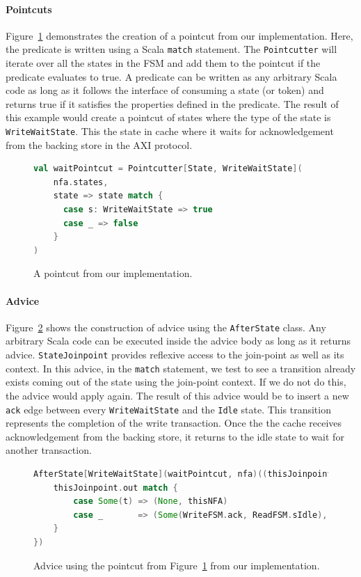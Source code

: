 \documentclass[conference]{IEEEtran}
\begin{document}
\paragraph{Pointcuts}
Figure~\ref{fig:pointcut} demonstrates the creation of a pointcut from our implementation. Here, the predicate is written using a Scala \texttt{match} statement. The \texttt{Pointcutter} will iterate over all the states in the FSM and add them to the pointcut if the predicate evaluates to true. A predicate can be written as any arbitrary Scala code as long as it follows the interface of consuming a state (or token) and returns true if it satisfies the properties defined in the predicate. The result of this example would create a pointcut of states where the type of the state is \texttt{WriteWaitState}. This the state in cache where it waits for acknowledgement from the backing store in the AXI protocol.

\begin{figure}[ht]
    \centering
    \begin{lstlisting}[language = Scala]
val waitPointcut = Pointcutter[State, WriteWaitState](
    nfa.states,
    state => state match {
      case s: WriteWaitState => true
      case _ => false
    }
)
    \end{lstlisting}
    \caption{A pointcut from our implementation.}
    \label{fig:pointcut}
\end{figure}

\paragraph{Advice}
Figure~\ref{fig:advice} shows the construction of advice using the \texttt{AfterState} class. Any arbitrary Scala code can be executed inside the advice body as long as it returns advice. \texttt{StateJoinpoint} provides reflexive access to the join-point as well as its context. In this advice, in the \texttt{match} statement, we test to see a transition already exists coming out of the state using the join-point context. If we do not do this, the advice would apply again. The result of this advice would be to insert a new \texttt{ack} edge between every \texttt{WriteWaitState} and the \texttt{Idle} state. This transition represents the completion of the write transaction. Once the the cache receives acknowledgement from the backing store, it returns to the idle state to wait for another transaction.

\begin{figure}[ht]
    \centering
    \begin{lstlisting}[language = Scala]
AfterState[WriteWaitState](waitPointcut, nfa)((thisJoinpoint: StateJoinpoint[WriteWaitState], thisNFA: NFA) => {
    thisJoinpoint.out match {
        case Some(t) => (None, thisNFA)
        case _       => (Some(WriteFSM.ack, ReadFSM.sIdle), thisNFA)
    }
})
    \end{lstlisting}
    \caption{Advice using the pointcut from Figure~\ref{fig:pointcut} from our implementation.}
    \label{fig:advice}
\end{figure}
\end{document}
